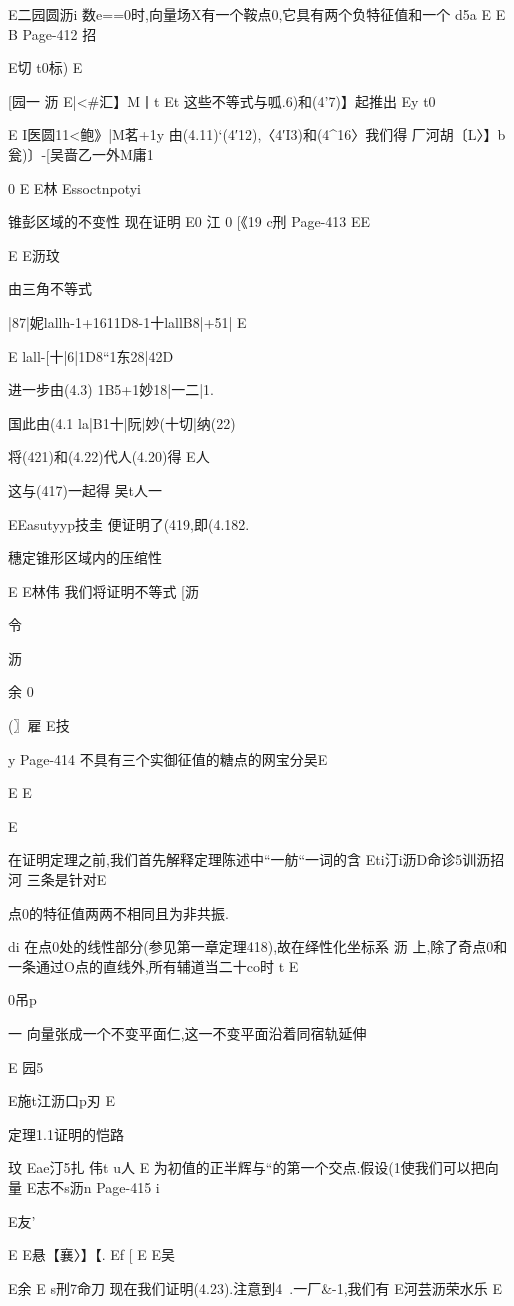 {{{{{{{{{E二园圆沥i
数e==0时,向量场X有一个鞍点0,它具有两个负特征值和一个
d5a
E
E
B
Page-412
招

E切
t0标)
E

[园一
沥
E|<#汇】M丨t
Et
这些不等式与呱.6)和(4'7)】起推出
Ey
t0

E
I医圆11<鲍》|M茗+1y
由(4.11)`(4′12),〈4′I3)和(4^16〉我们得
厂河胡〔L〉】b瓮)〕-[吴啬乙一外M庸1

0
E
E林
Essoctnpotyi

锥彭区域的不变性
现在证明
E0
江
0
[《19
c刑
Page-413
EE

E
E沥玟

由三角不等式

|87|妮lallh-1+1611D8-1十lallB8|+51|
E

E
lall-[十|6|1D8“1东28|42D

进一步由(4.3)
1B5+1妙18|一二|1.

国此由(4.1
la|B1十|阮|妙(十切|纳(22)

将(421)和(4.22)代人(4.20)得
E人

这与(417)一起得
吴t人一

EEasutyyp技圭
便证明了(419,即(4.182.

穗定锥形区域内的压绾性

E
E林伟
我们将证明不等式
[沥

令

沥

余
0

(〗雇
E技

y
Page-414
不具有三个实御征值的糖点的网宝分吴E

E
E

E

在证明定理之前,我们首先解释定理陈述中“一舫“一词的含
Eti汀i沥D命诊5训沥招河
三条是针对E

点0的特征值两两不相同且为非共振.

di
在点0处的线性部分(参见第一章定理418),故在绎性化坐标系
沥
上,除了奇点0和一条通过O点的直线外,所有辅道当二十co时
t
E

0吊p

一
向量张成一个不变平面仁,这一不变平面沿着同宿轨延伸

E
园5

E施t江沥口p刃
E

定理1.1证明的恺路

玟
Eae汀5扎
伟t
u人
E
为初值的正半辉与“的第一个交点.假设(1使我们可以把向量
E志不s沥n
Page-415
i

E友'}
E
E悬【襄〉】【.
Ef
[
E
E吴

E余
E
s刑7命刀
现在我们证明(4.23).注意到4~.一厂&-1,我们有
E河芸沥荣水乐
E

}}}}}}}}
